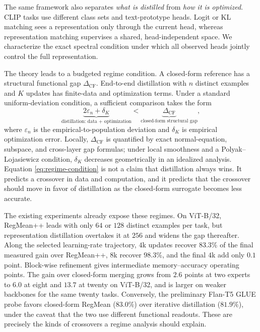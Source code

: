 \documentclass[letterpaper]{article} %
\theoremstyle{plain}
\theoremstyle{definition}
\begin{document}
The same framework also separates \emph{what is distilled} from \emph{how it is
optimized}. CLIP tasks use different class sets and text-prototype heads. Logit or KL
matching sees a representation only through the current head, whereas representation
matching supervises a shared, head-independent space. We characterize the exact spectral
condition under which all observed heads jointly control the full representation.

The theory leads to a budgeted regime condition. A closed-form reference has a structural
functional gap $\Delta_{\mathrm{CF}}$. End-to-end distillation with $n$ distinct examples
and $K$ updates has finite-data and optimization terms. Under a standard uniform-deviation
condition, a sufficient comparison takes the form
\begin{equation}
\underbrace{2\varepsilon_n+\delta_K}_{\text{distillation: data + optimization}}
<
\underbrace{\Delta_{\mathrm{CF}}}_{\text{closed-form structural gap}},
\label{eq:regime-condition}
\end{equation}
where $\varepsilon_n$ is the empirical-to-population deviation and $\delta_K$ is empirical
optimization error. Locally, $\Delta_{\mathrm{CF}}$ is quantified by exact normal-equation,
subspace, and cross-layer gap formulas; under local smoothness and a Polyak--Lojasiewicz
condition, $\delta_K$ decreases geometrically in an idealized analysis. Equation
\eqref{eq:regime-condition} is not a claim that distillation always wins. It predicts a
crossover in data and computation, and it predicts that the crossover should move in favor
of distillation as the closed-form surrogate becomes less accurate.

The existing experiments already expose these regimes. On ViT-B/32, RegMean++ leads with
only $64$ or $128$ distinct examples per task, but representation distillation overtakes it
at $256$ and widens the gap thereafter. Along the selected learning-rate trajectory, $4$k
updates recover $83.3\%$ of the final measured gain over RegMean++, $8$k recover
$98.3\%$, and the final $4$k add only $0.1$ point. Block-wise refinement gives intermediate
memory--accuracy operating points. The gain over closed-form merging grows from $2.6$
points at two experts to $6.0$ at eight and $13.7$ at twenty on ViT-B/32, and is larger on
weaker backbones for the same twenty tasks. Conversely, the preliminary Flan-T5 GLUE
probe favors closed-form RegMean ($83.0\%$) over iterative distillation ($81.9\%$), under
the caveat that the two use different functional readouts. These are precisely the kinds of
crossovers a regime analysis should explain.
\end{document}
